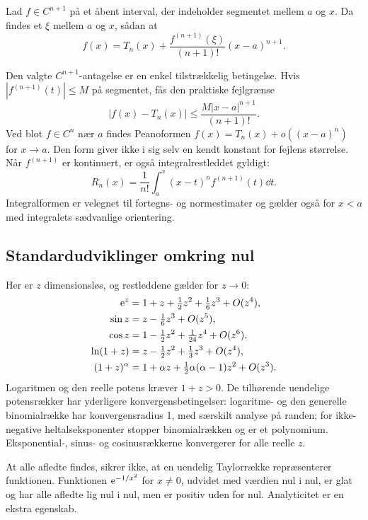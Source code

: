 \begin{saetning}
Lad $f\in C^{n+1}$ på et åbent interval, der indeholder segmentet mellem $a$ og $x$. Da findes et $\xi$ mellem $a$ og $x$, sådan at
\begin{equation}
 f(x)=T_n(x)+\frac{f^{(n+1)}(\xi)}{(n+1)!}(x-a)^{n+1}.
 \label{eq:rest}
\end{equation}
\end{saetning}
Den valgte $C^{n+1}$-antagelse er en enkel tilstrækkelig betingelse. Hvis $|f^{(n+1)}(t)|\le M$ på segmentet, fås den praktiske fejlgrænse
\[
 |f(x)-T_n(x)|\le\frac{M|x-a|^{n+1}}{(n+1)!}.
\]
Ved blot $f\in C^n$ nær $a$ findes Peanoformen $f(x)=T_n(x)+o((x-a)^n)$ for $x\to a$. Den form giver ikke i sig selv en kendt konstant for fejlens størrelse. Når $f^{(n+1)}$ er kontinuert, er også integralrestleddet gyldigt:
\[
 R_n(x)=\frac{1}{n!}\int_a^x (x-t)^n f^{(n+1)}(t)\dd t.
\]
Integralformen er velegnet til fortegns- og normestimater og gælder også for $x<a$ med integralets sædvanlige orientering.

\subsection{Standardudviklinger omkring nul}
Her er $z$ dimensionsløs, og restleddene gælder for $z\to0$:
\begin{align*}
 \mathrm{e}^z&=1+z+\tfrac12z^2+\tfrac16z^3+O(z^4),\\
 \sin z&=z-\tfrac16z^3+O(z^5),\\
 \cos z&=1-\tfrac12z^2+\tfrac1{24}z^4+O(z^6),\\
 \ln(1+z)&=z-\tfrac12z^2+\tfrac13z^3+O(z^4),\\
 (1+z)^\alpha&=1+\alpha z+\tfrac12\alpha(\alpha-1)z^2+O(z^3).
\end{align*}
Logaritmen og den reelle potens kræver $1+z>0$. De tilhørende uendelige potensrækker har yderligere konvergensbetingelser: logaritme- og den generelle binomialrække har konvergensradius 1, med særskilt analyse på randen; for ikke-negative heltalseksponenter stopper binomialrækken og er et polynomium. Eksponential-, sinus- og cosinusrækkerne konvergerer for alle reelle $z$.

At alle afledte findes, sikrer ikke, at en uendelig Taylorrække repræsenterer funktionen. Funktionen $\mathrm{e}^{-1/x^2}$ for $x\ne0$, udvidet med værdien nul i nul, er glat og har alle afledte lig nul i nul, men er positiv uden for nul. Analyticitet er en ekstra egenskab.



